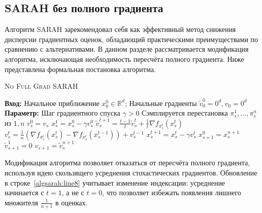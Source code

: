 \subsection{SARAH без полного градиента}\label{subsection:sarahalgorithm}

Алгоритм \textsc{SARAH} зарекомендовал себя как эффективный метод снижения дисперсии градиентных оценок, обладающий практическими преимуществами по сравнению с альтернативами. В данном разделе рассматривается модификация алгоритма, исключающая необходимость пересчёта полного градиента. Ниже представлена формальная постановка алгоритма.

\begin{algorithm}[H]
\caption{\textsc{No Full Grad SARAH}}\label{alg:sarah}
\begin{algorithmic}[1]
    \State \textbf{Вход:} Начальное приближение $x_0^0\in\mathbb{R}^d$; Начальные градиенты $\widetilde{v}_0^0 = 0^d, v_0 = 0^d$
    \State \textbf{Параметр:} Шаг градиентного спуска $\gamma > 0$
    \State Сэмплируется перестановка $\pi^1_s, \dots, \pi^{n}_s$  из $\overline{1, n}$ 
    \State $v_s^0 = v_s$
    \State $x_s^1 = x_s^0 - \gamma v_s^0$
    \State \label{algsarah:line8} $\widetilde{v}_s^{t+1} = \frac{t-1}{t} \widetilde{v}_s^{t} + \frac{1}{t} \nabla f_{\pi_s^t}(x_s^t)$
    \State \label{algsarah:line9} $v_s^{t} = \frac{1}{n}\left(\nabla f_{\pi_s^t}(x_s^t) - \nabla f_{\pi_s^t}(x_s^{t-1})\right) + v_s^{t-1}$
    \State \label{algsarah:line10} $x_s^{t+1} = x_s^t - \gamma v_s^t$
    \EndFor
    \State $x_{s+1}^0 = x_s^{n+1}$
    \State \label{tvs} $\widetilde{v}_{s+1}^1 = 0$
    \State $v_{s+1} = \widetilde{v}_s^{n+1}$
    \EndFor
\end{algorithmic}
\end{algorithm}

Модификация алгоритма позволяет отказаться от пересчёта полного градиента, используя идею скользящего усреднения стохастических градиентов. Обновление в строке~\ref{algsarah:line8} учитывает изменение индексации: усреднение начинается с $t=1$, а не с $t=0$, что позволяет избежать появления лишнего множителя \(\frac{1}{n+1}\) в оценках.

